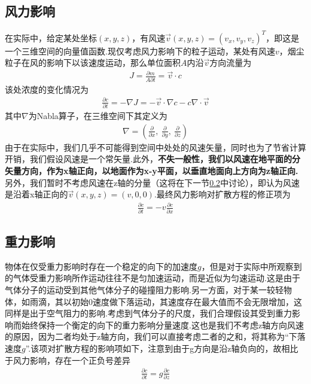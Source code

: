 \documentclass{article}
\begin{document}
	\subsection{风力影响}
	在实际中，给定某处坐标$(x, y, z)$，有风速$\vec{v}(x,y,z)=(v_x, v_y, v_z)^T$，即这是一个三维空间的向量值函数.现仅考虑风力影响下的粒子运动，某处有风速$v$，烟尘粒子在风的影响下以该速度运动，那么单位面积$A$内沿$\vec{v}$方向流量为
	\begin{align*}
		J = \frac{\partial m}{A\partial t} = \vec{v}·c
	\end{align*}
	该处浓度的变化情况为
	\begin{align*}
		\frac{\partial c}{\partial t} = -\nabla J = -\vec{v}·\nabla c - c\nabla · \vec{v}
	\end{align*}
	其中$\nabla$为Nabla算子，在三维空间下其定义为
	\begin{align*}
		\nabla = (\frac{\partial}{\partial x}, ~\frac{\partial}{\partial y}, ~\frac{\partial}{\partial z})
	\end{align*}
	由于在实际中，我们几乎不可能得到空间中处处的风速矢量，同时也为了节省计算开销，我们假设风速是一个常矢量.此外，\textbf{不失一般性，我们以风速在地平面的分矢量方向，作为x轴正向，以地面作为x-y平面，以垂直地面向上方向为z轴正向.}另外，我们暂时不考虑风速在z轴的分量（这将在下一节\ref{1}中讨论），即认为风速是沿着x轴正向的$\vec{v}(x, y, z)=(v, 0, 0)$.最终风力影响对扩散方程的修正项为
	\begin{align*}
		\frac{\partial c}{\partial t} = -v\frac{\partial c}{\partial x}
	\end{align*}
	
	
	\subsection{重力影响}\label{1}
	物体在仅受重力影响时存在一个稳定的向下的加速度$g$，但是对于实际中所观察到的气体受重力影响所作运动往往不是匀加速运动，而是近似为匀速运动.这是由于气体分子的运动受到其他气体分子的碰撞阻力影响.另一方面，对于某一较轻物体，如雨滴，其以初始0速度做下落运动，其速度存在最大值而不会无限增加，这同样是出于空气阻力的影响.考虑到气体分子的尺度，我们合理假设其受到重力影响而始终保持一个衡定的向下的重力影响分量速度.这也是我们不考虑z轴方向风速的原因，因为二者均处于z轴方向，我们可以直接考虑二者的之和，将其称为“下落速度$g$”.该项对扩散方程的影响项如下，注意到由于g方向是沿z轴负向的，故相比于风力影响，存在一个正负号差异
	\begin{align*}
		\frac{\partial c}{\partial t} = g\frac{\partial c}{\partial z}
	\end{align*}
\end{document}
